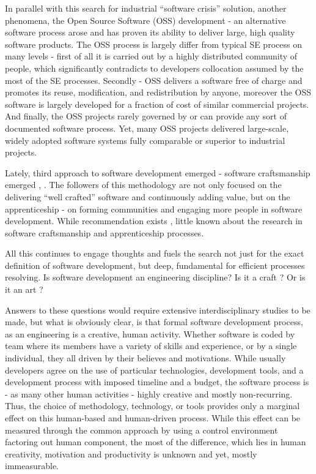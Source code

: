 In parallel with this search for industrial ``software crisis'' solution, another phenomena, 
the Open Source Software (OSS) 
development - an alternative software process arose and has proven its ability to deliver 
large, high quality software products. The OSS process is largely differ from typical SE process
on many levels - first of all it is carried out by a highly distributed community of people,
which significantly contradicts to developers collocation assumed by the most of the SE processes.
Secondly - OSS delivers a software free of charge and promotes its reuse, modification, and 
redistribution by anyone, moreover the OSS software is largely developed for a fraction of cost
of similar commercial projects. And finally, the OSS projects rarely governed by or can provide
any sort of documented software process. Yet, many OSS projects delivered large-scale, widely
adopted software systems fully comparable or superior to industrial projects.

Lately, third approach to software development emerged - software craftsmanship emerged 
\cite{citeulike:11058561}, \cite{citeulike:11058554}. The followers of this methodology 
are not only focused on the delivering ``well crafted'' software and continuously adding value,
but on the apprenticeship - on forming communities and engaging more people in software development.
While recommendation exists \cite{citeulike:11058784}, little known about the research 
in software craftsmanship and apprenticeship processes.

All this continues to engage thoughts and fuels the search not just for the exact definition 
of software development, but deep, fundamental for efficient processes resolving. 
Is software development an engineering discipline? Is it a craft \cite{citeulike:5203446}? 
Or is it an art \cite{citeulike:11045694}?

Answers to these questions would require extensive interdisciplinary studies to be made, 
but what is obviously clear, is that formal software development process, as an engineering 
is a creative, human activity. 
Whether software is coded 
by team where its members have a variety of skills and experience, or by a single individual,
they all driven by their believes and motivations. While usually developers agree on the use of 
particular technologies, development tools, and a development process with imposed timeline and 
a budget, the software process is - as many other human activities - highly creative and mostly 
non-recurring. Thus, the choice of methodology, technology, or tools provides only a marginal 
effect on this human-based and human-driven process. While this effect can be measured through 
the common approach by using a control environment factoring out human component, the most of 
the difference, which lies in human creativity, motivation and productivity is unknown and yet, 
mostly immeasurable.

